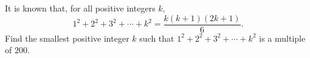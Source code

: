 It is known that, for all positive integers $k,$
\[1^{2}+2^{2}+3^{2}+\cdots+k^{2}=\frac{k(k+1)(2k+1)}{6}. \]Find the smallest positive integer $k$ such that $1^{2}+2^{2}+3^{2}+\cdots+k^{2}$ is a multiple of $200.$